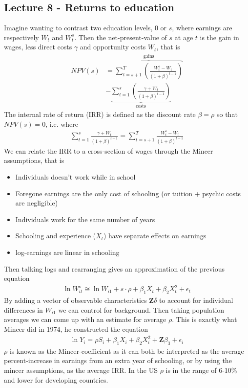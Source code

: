 \documentclass[12pt, a4paper]{article}
\begin{document}
\begin{multicols}{2}
\subsection{Lecture 8 - Returns to education}
Imagine wanting to contrast two education levels, 0 or $s$, where earnings are respectively $W_t$ and $W_t^s$. Then the net-present-value of $s$ at age $t$ is the gain in wages, less direct costs $\gamma$ and opportunity costs $W_t$, that is 
\begin{align*}
NPV(s) &= \overbrace{\sum_{t=s+1}^T \left( \frac{W_t^s - W_t}{(1+\beta)^{t-1}} \right)}^{\text{gains}} \\
& -\underbrace{\sum_{t=1}^s \left( \frac{\gamma + W_t}{(1+\beta)^{t-1}} \right)}_{\text{costs}} 
\end{align*}
The internal rate of return (IRR) is defined as the discount rate $\beta = \rho$ so that $NPV(s) = 0$, i.e. where
\begin{align*} 
\sum_{t=1}^s \frac{\gamma + W_t}{(1+\beta)^{t-1}} = \sum_{t=s+1}^T \frac{W_t^s - W_t}{(1+\beta)^{t-1}}
\end{align*}
We can relate the IRR to a cross-section of wages through the Mincer assumptions, that is 
\begin{itemize}
\item Individuals doesn't work while in school
\item Foregone earnings are the only cost of schooling (or tuition + psychic costs are negligible)
\item Individuals work for the same number of years
\item Schooling and experience ($X_t$) have separate effects on earnings
\item log-earnings are linear in schooling
\end{itemize}
Then talking logs and rearranging gives an approximation of the previous equation
\begin{align*}
\ln W_{it}^s \cong \ln W_{i1} +s \cdot \rho + \beta_1 X_t + \beta_2 X_t^2 + \epsilon_t
\end{align*}
By adding a vector of observable characteristics $\mathbf{Z}\delta$ to account for individual differences in $W_{i1}$ we can control for background. Then taking population averages we can come up with an estimate for average $\rho$. This is exactly what Mincer did in 1974, he constructed the equation
\begin{align*}
\ln Y_i = \rho S_i + \beta_1 X_i + \beta_2 X_i^2 + \mathbf{Z}\beta_3 + \epsilon_i
\end{align*}
$\rho$ is known as the Mincer-coefficient as it can both be interpreted as the average percent-increase in earnings from an extra year of schooling, or by using the mincer assumptions, as the average IRR. In the US $\rho$ is in the range of 6-10\% and lower for developing countries.


\end{multicols}
\end{document}
